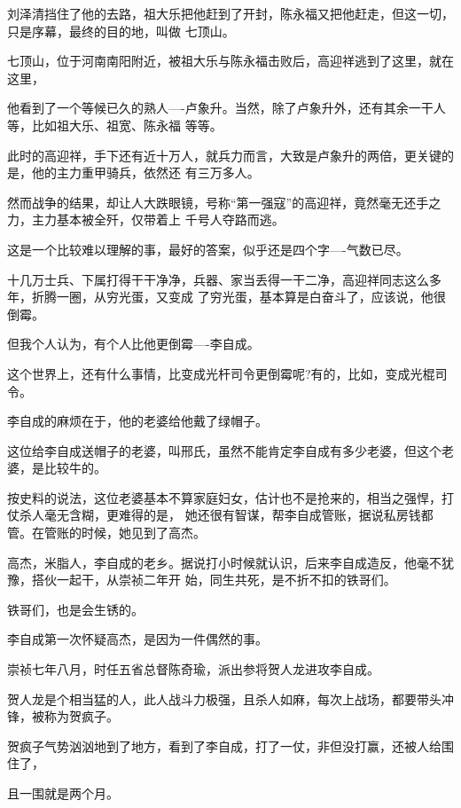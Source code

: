 \documentclass[11pt,a4paper,onecolumn]{article}
\begin{document}
刘泽清挡住了他的去路，祖大乐把他赶到了开封，陈永福又把他赶走，但这一切，只是序幕，最终的目的地，叫做
七顶山。

七顶山，位于河南南阳附近，被祖大乐与陈永福击败后，高迎祥逃到了这里，就在这里，

他看到了一个等候已久的熟人----卢象升。当然，除了卢象升外，还有其余一干人等，比如祖大乐、祖宽、陈永福
等等。

此时的高迎祥，手下还有近十万人，就兵力而言，大致是卢象升的两倍，更关键的是，他的主力重甲骑兵，依然还
有三万多人。

然而战争的结果，却让人大跌眼镜，号称``第一强寇''的高迎祥，竟然毫无还手之力，主力基本被全歼，仅带着上
千号人夺路而逃。

这是一个比较难以理解的事，最好的答案，似乎还是四个字----气数已尽。

十几万士兵、下属打得干干净净，兵器、家当丢得一干二净，高迎祥同志这么多年，折腾一圈，从穷光蛋，又变成
了穷光蛋，基本算是白奋斗了，应该说，他很倒霉。

但我个人认为，有个人比他更倒霉----李自成。

这个世界上，还有什么事情，比变成光杆司令更倒霉呢?有的，比如，变成光棍司令。

李自成的麻烦在于，他的老婆给他戴了绿帽子。

这位给李自成送帽子的老婆，叫邢氏，虽然不能肯定李自成有多少老婆，但这个老婆，是比较牛的。

按史料的说法，这位老婆基本不算家庭妇女，估计也不是抢来的，相当之强悍，打仗杀人毫无含糊，更难得的是，
她还很有智谋，帮李自成管账，据说私房钱都管。在管账的时候，她见到了高杰。

高杰，米脂人，李自成的老乡。据说打小时候就认识，后来李自成造反，他毫不犹豫，搭伙一起干，从崇祯二年开
始，同生共死，是不折不扣的铁哥们。

铁哥们，也是会生锈的。

李自成第一次怀疑高杰，是因为一件偶然的事。

崇祯七年八月，时任五省总督陈奇瑜，派出参将贺人龙进攻李自成。

贺人龙是个相当猛的人，此人战斗力极强，且杀人如麻，每次上战场，都要带头冲锋，被称为贺疯子。

贺疯子气势汹汹地到了地方，看到了李自成，打了一仗，非但没打赢，还被人给围住了，

且一围就是两个月。

\section[\thesection]{}
\end{document}
